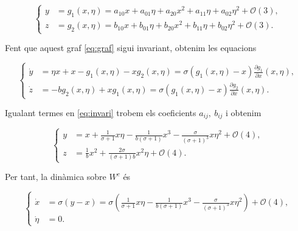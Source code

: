 \documentclass[11pt,a4paper,openright,oneside]{article}
\numberwithin{equation}{section}
\theoremstyle{definition}
\begin{document}
\begin{equation} \label{eq:graf}
    \left\{ \begin{aligned} 
            y &= g_1(x, \eta)=a_{10}x+a_{01}\eta+a_{20}x^2+a_{11}\eta+a_{02}\eta^2+\mathcal{O}(3), \\
            z &= g_2(x, \eta)=b_{10}x+b_{01}\eta+b_{20}x^2+b_{11}\eta+b_{02}\eta^2+\mathcal{O}(3).
        \end{aligned} \right.    
\end{equation}

Fent que aquest graf \eqref{eq:graf} sigui invariant, obtenim les equacions

\begin{equation} \label{eq:invari}
 \left\{ \begin{aligned} 
            \dot{y} &= \eta x + x - g_1(x, \eta) -xg_2(x, \eta) = \sigma\left(g_1(x, \eta) - x\right)\frac{\partial g_1}{\partial x}(x, \eta), \\
            \dot{z} &=  -bg_2(x, \eta) + xg_1(x, \eta) = \sigma\left(g_1(x, \eta) - x\right)\frac{\partial g_2}{\partial x}(x, \eta).
        \end{aligned} \right.    
\end{equation}

Igualant termes en \eqref{eq:invari} trobem els coeficients $a_{ij}, \ b_{ij}$ i obtenim 

\begin{equation} \label{eq:graf_2}
    \left\{ \begin{aligned} 
            y &= x + \frac{1}{\sigma+1}x\eta - \frac{1}{b(\sigma+1)}x^3 - \frac{\sigma}{(\sigma+1)^3}x\eta^2 + \mathcal{O}(4), \\
            z &= \frac{1}{b}x^2 + \frac{2\sigma}{(\sigma + 1)b}x^2\eta + \mathcal{O}(4).
        \end{aligned} \right.    
\end{equation}

Per tant, la dinàmica sobre $W^c$ és

\begin{equation} \label{eq:graf_2}
    \left\{ \begin{aligned} 
            \dot{x} &= \sigma(y-x) = \sigma\left(\frac{1}{\sigma+1}x\eta - \frac{1}{b(\sigma +1)}x^3 - \frac{\sigma}{\left(\sigma+1\right)^3}x\eta^2\right) + \mathcal{O}(4), \\
            \dot{\eta} &= 0.
        \end{aligned} \right.    
\end{equation}
\end{document}

